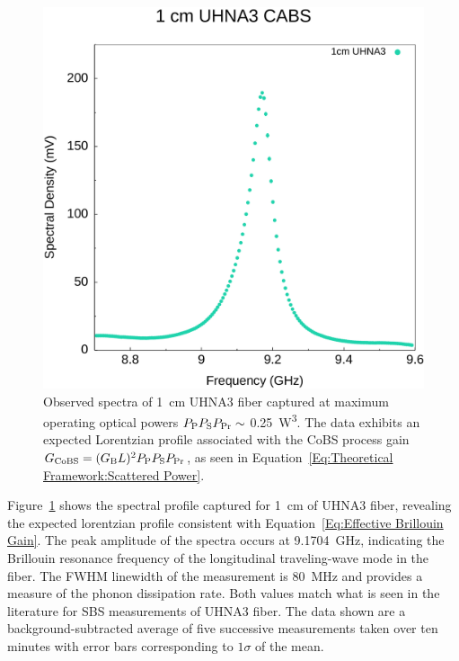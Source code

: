 \begin{figure}[t!]
  \centering
  \includegraphics[width=\textwidth]{figs/3-CoBS/1cmUHNA3.pdf}
  \caption{Observed spectra of \SI{1}{\centi\meter} \ac{UHNA3} fiber captured at maximum operating optical powers \(P_{\rm P}P_{\rm S}P_{\rm Pr} \sim\) \SI{0.25}{\cubic\watt}. The data exhibits an expected Lorentzian profile associated with the \ac{CoBS} process gain \(G_{\rm CoBS} = (G_{\rm B}L)^{2}P_{\rm P}P_{\rm S}P_{\rm Pr}\), as seen in Equation~\ref{Eq:Theoretical Framework:Scattered Power}.}
  \label{fig:1cmUHNA3}
\end{figure}

Figure~\ref{fig:1cmUHNA3} shows the spectral profile captured for \SI{1}{\centi\meter} of \ac{UHNA3} fiber, revealing the expected lorentzian profile consistent with Equation~\ref{Eq:Effective Brillouin Gain}. The peak amplitude of the spectra occurs at \SI{9.1704}{\giga\hertz}, indicating the Brillouin resonance frequency of the longitudinal traveling-wave mode in the fiber. The \ac{FWHM} linewidth of the measurement is \SI{80}{\mega\hertz} and provides a measure of the phonon dissipation rate. Both values match what is seen in the literature for \ac{SBS} measurements of \ac{UHNA3} fiber.\cite{behunin2015long} The data shown are a background-subtracted average of five successive measurements taken over ten minutes with error bars corresponding to \(1\sigma\) of the mean.

